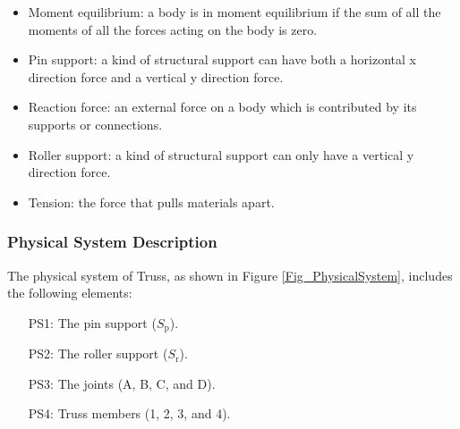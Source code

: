 \documentclass[12pt]{article}
\begin{document}
\begin{itemize}
	
	\item Moment equilibrium: a body is in moment equilibrium if the sum of all 
	the moments of all the forces acting on the body is zero.
	
\end{itemize}

\begin{itemize}

\item Pin support: a kind of structural support can have both a horizontal x 
direction force and a vertical y direction force.

\end{itemize}

\begin{itemize}
	
	\item Reaction force: an external force on a body which is contributed by 
	its supports or connections.
	
\end{itemize}

\begin{itemize}
	
	\item Roller support: a kind of structural support can only have a 
	vertical y direction force.
	
\end{itemize}

\begin{itemize}
	
	\item Tension: the force that pulls materials apart.
	
\end{itemize}

\subsubsection{Physical System Description} \label{sec_phySystDescrip}

The physical system of Truss, as shown in Figure \ref{Fig_PhysicalSystem},
includes the following elements:

\begin{itemize}

\item[PS1:] The pin support ($S_\text{p}$).

\item[PS2:] The roller support ($S_\text{r}$).

\item[PS3:] The joints (A, B, C, and D).

\item[PS4:] Truss members (1, 2, 3, and 4).

\end{itemize}
\end{document}
